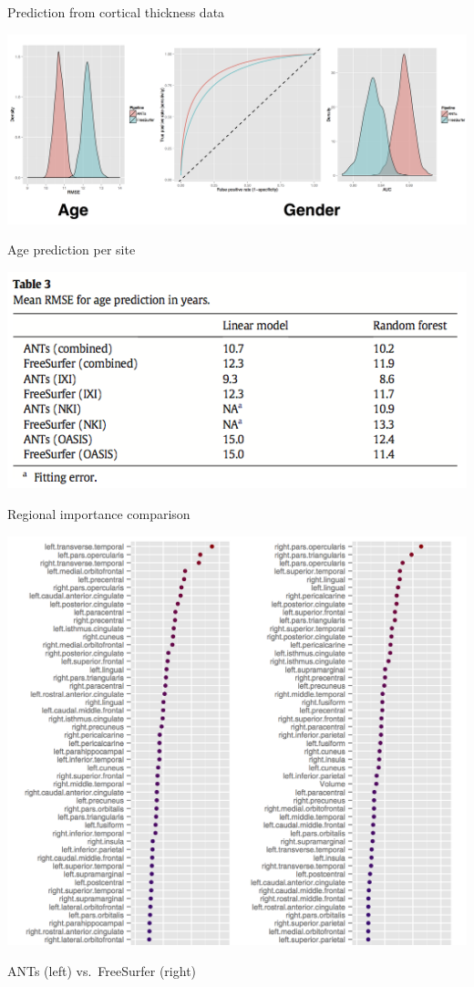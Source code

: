 \documentclass[ignorenonframetext,]{beamer}
\begin{document}
\begin{frame}{Prediction from cortical thickness data}

\includegraphics{./evaluation/figures/evaluation.png}

\end{frame}

\begin{frame}{Age prediction per site}

\includegraphics{./evaluation/figures/agePredictionPerSite.png}

\end{frame}

\begin{frame}{Regional importance comparison}

\includegraphics{./evaluation/figures/antsvfreesurfer_Importance.png}

ANTs (left) vs.~FreeSurfer (right)

\end{frame}
\end{document}
